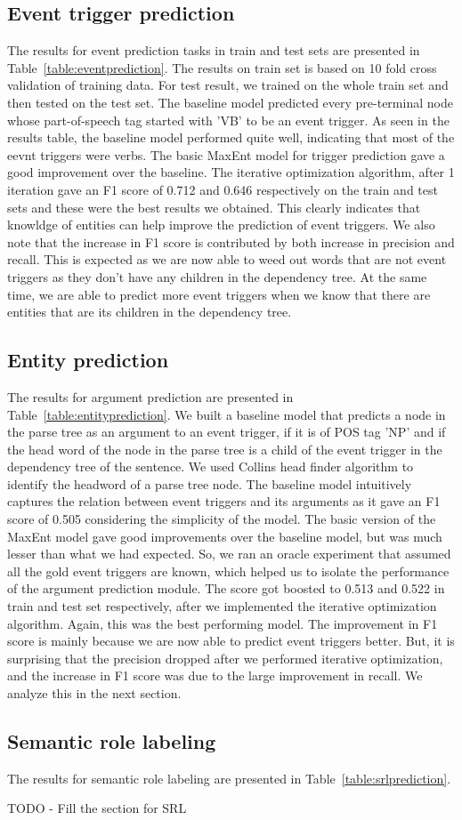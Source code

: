 \subsection{Event trigger prediction}
The results for event prediction tasks in train and test sets are presented in Table~\ref{table:eventprediction}. The results on train set is based on 10 fold cross validation of training data. For test result, we trained on the whole train set and then tested on the test set. The baseline model predicted every pre-terminal node whose part-of-speech tag started with 'VB' to be an event trigger. As seen in the results table, the baseline model performed quite well, indicating that most of the eevnt triggers were verbs. The basic MaxEnt model for trigger prediction gave a good improvement over the baseline. The iterative optimization algorithm, after 1 iteration gave an F1 score of 0.712 and 0.646 respectively on the train and test sets and these were the best results we obtained. This clearly indicates that knowldge of entities can help improve the prediction of event triggers. We also note that the increase in F1 score is contributed by both increase in precision and recall. This is expected as we are now able to weed out words that are not event triggers as they don't have any children in the dependency tree. At the same time, we are able to predict more event triggers when we know that there are entities that are its children in the dependency tree.

\subsection{Entity prediction}
The results for argument prediction are presented in Table~\ref{table:entityprediction}. We built a baseline model that predicts a node in the parse tree as an argument to an event trigger, if it is of POS tag 'NP' and if the head word of the node in the parse tree is a child of the event trigger in the dependency tree of the sentence. We used Collins head finder algorithm to identify the headword of a parse tree node. The baseline model intuitively captures the relation between event triggers and its arguments as it gave an F1 score of 0.505 considering the simplicity of the model. The basic version of the MaxEnt model gave good improvements over the baseline model, but was much lesser than what we had expected. So, we ran an oracle experiment that assumed all the gold event triggers are known, which helped us to isolate the performance of the argument prediction module. The score got boosted to 0.513 and 0.522 in train and test set respectively, after we implemented the iterative optimization algorithm. Again, this was the best performing model. The improvement in F1 score is mainly because we are now able to predict event triggers better. But, it is surprising that the precision dropped after we performed iterative optimization, and the increase in F1 score was due to the large improvement in recall. We analyze this in the next section.

\subsection{Semantic role labeling}
The results for semantic role labeling are presented in Table~\ref{table:srlprediction}. 

TODO - Fill the section for SRL